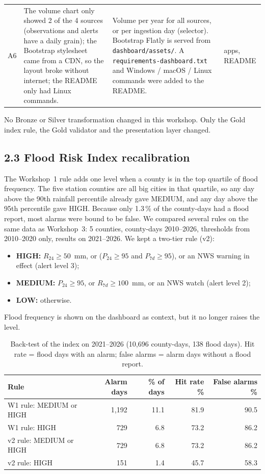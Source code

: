 \documentclass[stu, 12pt, letterpaper, donotrepeattitle, floatsintext, natbib]{apa7}
\begin{document}
{\begin{xltabular}{\textwidth}{>{\raggedright\arraybackslash}p{0.7cm} >{\raggedright\arraybackslash}p{3.4cm} >{\raggedright\arraybackslash}p{4.6cm} >{\raggedright\arraybackslash}X}
A6 & The volume chart only showed 2 of the 4 sources (observations and alerts have a daily grain); the Bootstrap stylesheet came from a CDN, so the layout broke without internet; the README only had Linux commands. & Volume per year for all sources, or per ingestion day (selector). Bootstrap Flatly is served from \texttt{dashboard/assets/}. A \texttt{requirements-dashboard.txt} and Windows / macOS / Linux commands were added to the README. & apps, README \\
\end{xltabular}
}

\noindent No Bronze or Silver transformation changed in this workshop. Only the Gold index rule, the Gold validator and the presentation layer changed.

\subsection{2.3 Flood Risk Index recalibration}
The Workshop~1 rule adds one level when a county is in the top quartile of flood frequency. The five station counties are all big cities in that quartile, so any day above the 90th rainfall percentile already gave MEDIUM, and any day above the 95th percentile gave HIGH. Because only 1.3\,\% of the county-days had a flood report, most alarms were bound to be false. We compared several rules on the same data as Workshop~3: 5 counties, county-days 2010--2026, thresholds from 2010--2020 only, results on 2021--2026. We kept a two-tier rule (v2):
\begin{itemize}
    \item \textbf{HIGH:} $R_{24} \geq 50$~mm, or ($P_{24} \geq 95$ and $P_{7d} \geq 95$), or an NWS warning in effect (alert level 3);
    \item \textbf{MEDIUM:} $P_{24} \geq 95$, or $R_{7d} \geq 100$~mm, or an NWS watch (alert level 2);
    \item \textbf{LOW:} otherwise.
\end{itemize}
Flood frequency is shown on the dashboard as context, but it no longer raises the level.

\begin{table}[H]
\centering
\footnotesize
\caption{Back-test of the index on 2021--2026 (10,696 county-days, 138 flood days). Hit rate = flood days with an alarm; false alarms = alarm days without a flood report.}
\label{tab:fri}
\begin{tabular}{@{}lrrrr@{}}
\toprule
Rule & Alarm days & \% of days & Hit rate \% & False alarms \% \\
\midrule
W1 rule: MEDIUM or HIGH & 1,192 & 11.1 & 81.9 & 90.5 \\
W1 rule: HIGH & 729 & 6.8 & 73.2 & 86.2 \\
v2 rule: MEDIUM or HIGH & 729 & 6.8 & 73.2 & 86.2 \\
v2 rule: HIGH & 151 & 1.4 & 45.7 & 58.3 \\
\bottomrule
\end{tabular}
\end{table}
\end{document}
